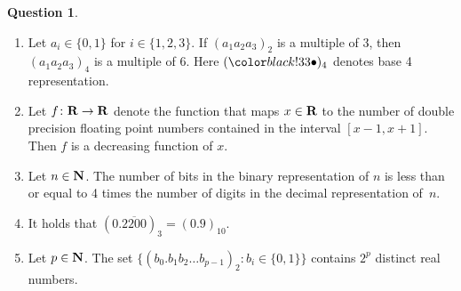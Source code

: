 \documentclass[11pt]{article}
\theoremstyle{definition}
\newtheorem{question}{Question}
\theoremstyle{remark}
\begin{document}
\begin{question}
\begin{enumerate}
        \item
            Let $a_i \in \{0, 1\}$ for $i \in \{1, 2, 3\}$.
            If $(a_1 a_2 a_3)_2$ is a multiple of 3,
            then $(a_1 a_2 a_3)_4$ is a multiple of 6.
            Here $(\placeholder)_4$ denotes base 4 representation.

        \item
            Let $f\colon \mathbf R \to \mathbf R$ denote the function that maps $x \in \mathbf R$
            to the number of double precision floating point numbers contained in the interval $[x-1, x+1]$.
            Then $f$ is a decreasing function of $x$.

        \item
            Let $n \in \mathbf N$.
            The number of bits in the binary representation of $n$ is less than or equal to 4 times the number of digits in the decimal representation of~$n$.

        \item
            It holds that $(0.\overline{2200})_3 = (0.9)_{10}$.

        \item
            Let $p \in \mathbf N$.
            The set
            \(
                \bigl\{ (b_0. b_1 b_2 \dots b_{p-1})_2 \colon b_i \in \{0, 1\} \bigr\}
            \)
            contains $2^{p}$ distinct real numbers.
    \end{enumerate}
\end{question}
\end{document}
